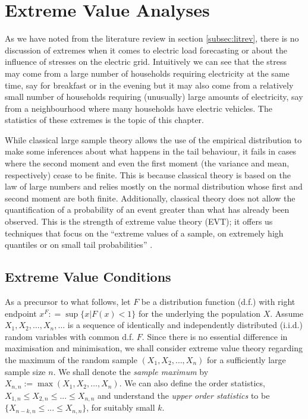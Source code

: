 
\chapter{Extreme Value Analyses} \label{sec:EVT}

As we have noted from the literature review in section \ref{subsec:litrev}, there is no discussion of extremes when it comes to electric load forecasting or about the influence of stresses on the electric grid. Intuitively we can see that the stress may come from a large number of households requiring electricity at the same time, say for breakfast or in the evening but it may also come from a relatively small number of households requiring (unusually) large amounts of electricity, say from a neighbourhood where many households have electric vehicles. The statistics of these extremes is the topic of this chapter.

While classical large sample theory allows the use of the empirical distribution to make some inferences about what happens in the tail behaviour, it fails in cases where the second moment and even the first moment (the variance and mean, respectively) cease to be finite. This is because classical theory is based on the law of large numbers and relies mostly on the normal distribution whose first and second moment are both finite. Additionally, classical theory does not allow the quantification of a probability of an event greater than what has already been observed. This is the strength of extreme value theory (EVT); it offers us techniques that focus on the ``extreme values of a sample, on extremely high quantiles or on small tail probabilities'' \cite[ch.~1]{beirlant}.

\section{Extreme Value Conditions} \label{subsec:EVT}

As a precursor to what follows, let $F$ be a distribution function (d.f.) with right endpoint $x^F : = \sup\{x | F(x) < 1\}$ for the underlying the population $X$. Assume $X_1,X_2, \ldots, X_n, \ldots$ is a sequence of identically and independently distributed (i.i.d.) random variables with common d.f. $F$. Since there is no essential difference in maximisation and minimisation, we shall consider extreme value theory regarding the maximum of the random sample $(X_1,X_2, \ldots, X_n)$ for a sufficiently large sample size $n$. We shall denote the \textit{sample maximum} by $X_{n,n}:= \max(X_1,X_2, \ldots, X_n)$. We can also define the order statistics, $X_{1,n} \le X_{2,n} \le ... \le X_{n,n}$ and understand the \textit{upper order statistics} to  be $\{X_{n-k,n} \le ... \le X_{n,n}\}$, for suitably small $k$.%


